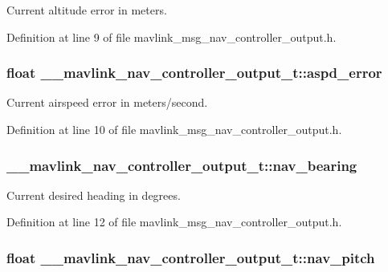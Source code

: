 Current altitude error in meters. 



Definition at line 9 of file mavlink\-\_\-msg\-\_\-nav\-\_\-controller\-\_\-output.\-h.

\hypertarget{struct____mavlink__nav__controller__output__t_af9d8faadd55533885c61717a7a7ac407}{
\subsubsection[{aspd\-\_\-error}]{\setlength{\rightskip}{0pt plus 5cm}float \-\_\-\-\_\-mavlink\-\_\-nav\-\_\-controller\-\_\-output\-\_\-t\-::aspd\-\_\-error}}\label{struct____mavlink__nav__controller__output__t_af9d8faadd55533885c61717a7a7ac407}


Current airspeed error in meters/second. 



Definition at line 10 of file mavlink\-\_\-msg\-\_\-nav\-\_\-controller\-\_\-output.\-h.

\hypertarget{struct____mavlink__nav__controller__output__t_ae18c3d9716a9ec77450d9acf03ea1f64}{
\subsubsection[{nav\-\_\-bearing}]{ \-\_\-\-\_\-mavlink\-\_\-nav\-\_\-controller\-\_\-output\-\_\-t\-::nav\-\_\-bearing}}\label{struct____mavlink__nav__controller__output__t_ae18c3d9716a9ec77450d9acf03ea1f64}


Current desired heading in degrees. 



Definition at line 12 of file mavlink\-\_\-msg\-\_\-nav\-\_\-controller\-\_\-output.\-h.

\hypertarget{struct____mavlink__nav__controller__output__t_a12445c329084694f295b51a1f5587691}{
\subsubsection[{nav\-\_\-pitch}]{\setlength{\rightskip}{0pt plus 5cm}float \-\_\-\-\_\-mavlink\-\_\-nav\-\_\-controller\-\_\-output\-\_\-t\-::nav\-\_\-pitch}}\label{struct____mavlink__nav__controller__output__t_a12445c329084694f295b51a1f5587691}



